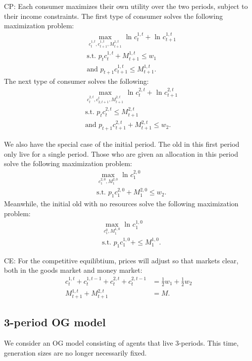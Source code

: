 \documentclass[11pt]{article} %
\begin{document}
CP: Each consumer maximizes their own utility over the two periods, subject to their income constraints.
The first type of consumer solves the following maximization problem:
\begin{align*}
&\max_{c_t^{1,t},c_{t+1}^{1,t},M_{t+1}^{1,t}} \text{ ln } c_{t}^{1,t} + \text{ ln } c_{t+1}^{1,t}\\
&\text{s.t. }  p_t c_{t}^{1,t} + M_{t+1}^{1,t} \leq w_1 \\
& \text{and } p_{t+1} c_{t+1}^{1,t} \leq M_{t+1}^{1,t}.
\end{align*}
The next type of consumer solves the following:
\begin{align*}
&\max_{c_t^{2,t},c_{2,t+1}^{t},M_{t+1}^{2,t}} \text{ ln } c_{t}^{2,t} + \text{ ln } c_{t+1}^{2,t}\\
&\text{s.t. }  p_t c_{t}^{2,t}  \leq M_{t+1}^{2,t} \\
& \text{and } p_{t+1} c_{t+1}^{2,t} + M_{t+1}^{2,t}\leq w_2.
\end{align*}

We also have the special case of the initial period. The old in this first period only live for a single period. Those who are given an allocation in this period solve the following maximization problem:
\begin{align*}
&\max_{c_{1}^{2,0},M_1^{2,0}} \text{ ln } c_{1}^{2,0} \\
&\text{s.t. }  p_1 c_{1}^{2,0} + M_{1}^{2,0} \leq w_2.
\end{align*}
Meanwhile, the initial old with no resources solve the following maximization problem:
\begin{align*}
&\max_{c_{1}^{0},M_{1}^{1,0}} \text{ ln } c_{1}^{1,0} \\
&\text{s.t. }  p_1 c_{1}^{1,0} + \leq M_{1}^{1,0} .
\end{align*}

CE: For the competitive equilibtium, prices will adjust so that markets clear, both in the goods market and money market:
\begin{align*}
c_{t}^{1,t} +  c_{t}^{1,t-1} + c_{t}^{2,t} +  c_{t}^{2,t-1} &= \frac{1}{2}w_1 + \frac{1}{2} w_2 \\
M_{t+1}^{1,t} + M_{t+1}^{2,t} &= M.
\end{align*}

\subsection{3-period OG model}
We consider an OG model consisting of agents that live 3-periods. This time, generation sizes are no longer necessarily fixed.
\end{document}
